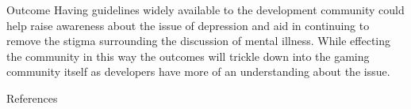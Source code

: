 \documentclass{beamer}
\begin{document}
\begin{frame}{Outcome}
	Having guidelines widely available to the development community could help raise awareness about the issue of depression and aid in continuing to remove the stigma surrounding the discussion of mental illness. While effecting the community in this way the outcomes will trickle down into the gaming community itself as developers have more of an understanding about the issue.
\end{frame}

\begin{frame}{References}
	
	
\end{frame}
\end{document}
